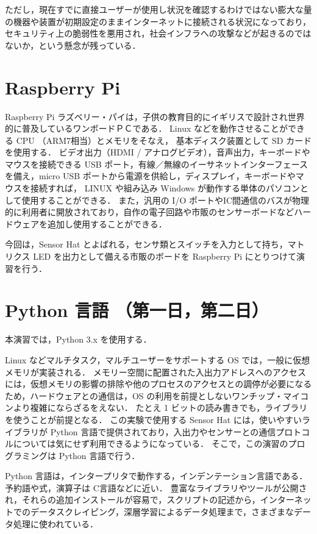 \documentclass[11pt,a4,epsf]{report}
\begin{document}
ただし，現在すでに直接ユーザーが使用し状況を確認するわけではない膨大な量の機器や装置が初期設定のままインターネットに接続される状況になっており，
セキュリティ上の脆弱性を悪用され，社会インフラへの攻撃などが起きるのではないか，という懸念が残っている．

\section{Raspberry Pi}

Raspberry Pi ラズベリー・パイは，子供の教育目的にイギリスで設計され世界的に普及しているワンボードＰＣである．
Linux などを動作させることができる CPU （ARM7相当）とメモリをそなえ， 基本ディスク装置として SD カードを使用する．
ビデオ出力（HDMI / アナログビデオ），音声出力，キーボードやマウスを接続できる USB ポート，有線／無線のイーサネットインターフェースを備え，micro USB ポートから電源を供給し，ディスプレイ，キーボードやマウスを接続すれば，
LINUX や組み込み Windows が動作する単体のパソコンとして使用することができる．
また，汎用の I/O ポートやIC間通信のバスが物理的に利用者に開放されており，自作の電子回路や市販のセンサーボードなどハードウェアを追加し使用することができる．

今回は，Sensor Hat  とよばれる，センサ類とスイッチを入力として持ち，マトリクス LED を出力として備える市販のボードを Raspberry Pi にとりつけて演習を行う．


\section{Python 言語 （第一日，第二日）}

本演習では，Python 3.x を使用する．

Linux などマルチタスク，マルチユーザーをサポートする OS では，一般に仮想メモリが実装される．
メモリー空間に配置された入出力アドレスへのアクセスには，仮想メモリの影響の排除や他のプロセスのアクセスとの調停が必要になるため，ハードウェアとの通信は，OS の利用を前提としないワンチップ・マイコンより複雑にならざるをえない．
たとえ 1 ビットの読み書きでも，ライブラリを使うことが前提となる．
この実験で使用する Sensor Hat には，使いやすいライブラリが Python 言語で提供されており，入出力やセンサーとの通信プロトコルについては気にせず利用できるようになっている．
そこで，この演習のプログラミングは Python 言語で行う．

Python 言語は，インタープリタで動作する，インデンテーション言語である．
予約語や式，演算子は C言語などに近い．
豊富なライブラリやツールが公開され，それらの追加インストールが容易で，スクリプトの記述から，インターネットでのデータスクレイピング，深層学習によるデータ処理まで，さまざまなデータ処理に使われている．
\end{document}
